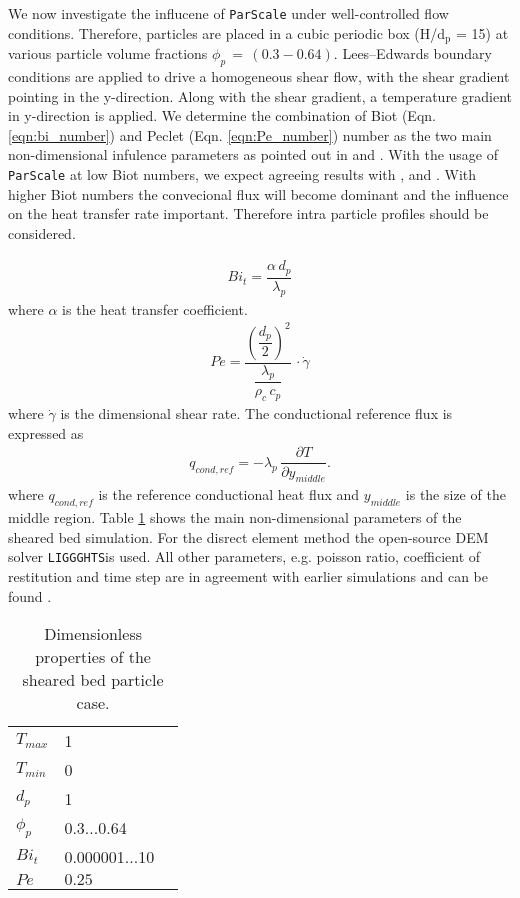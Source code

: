 \documentclass{particles2015}
\begin{document}
We now investigate the influcene of \texttt{ParScale} under well-controlled flow conditions. Therefore, particles are placed in a cubic periodic box (H/$\text{d}_\text{p}$ = 15) at various particle volume fractions $\phi_p \, =  \, (0.3 - 0.64)$. Lees–Edwards boundary conditions are applied to drive a homogeneous shear flow, with the shear gradient pointing in the y-direction. Along with the shear gradient, a temperature gradient in y-direction is applied. We determine the combination of Biot (Eqn. \ref{eqn:bi_number}) and Peclet (Eqn. \ref{eqn:Pe_number}) number as the two main non-dimensional infulence parameters as pointed out in \cite{Mohan2014} and \cite{Chialvo2012}. With the usage of \texttt{ParScale} at low Biot numbers, we expect agreeing results with \cite{Mohan2014}, \cite{Chialvo2012} and \cite{Vargas2001}. With higher Biot numbers the convecional flux will become dominant and the influence on the heat transfer rate important. Therefore intra particle profiles should be considered.

\begin{align}
Bi_t = \dfrac{\alpha\, d_p}{\lambda_p}
\label{eqn:bi_number}
\end{align}
where $\alpha$ is the heat transfer coefficient.
\begin{align}
Pe = \dfrac{\left(\dfrac{d_p}{2}\right)^2}{\dfrac{\lambda_p}{\rho_c \, c_p}} \, \cdot \dot{\gamma}
\label{eqn:Pe_number}
\end{align}  
where $\dot{\gamma}$ is the dimensional shear rate. The conductional reference flux is expressed as \cite{Chialvo2012}
\begin{align}
q_{cond,ref} = - \lambda_p \, \dfrac{\partial T}{\partial y_{middle}}.
\end{align}
where $q_{cond,ref}$ is the reference conductional heat flux and $y_{middle}$ is the size of the middle region. Table \ref{tab:properties_sheard_bed} shows the main non-dimensional parameters of the sheared bed simulation. For the disrect element method the open-source DEM solver \texttt{LIGGGHTS}\textregistered is used. All other parameters, e.g. poisson ratio, coefficient of restitution and time step are in agreement with earlier simulations and can be found \cite{Mohan2014}.

\begin{table}[h]
  \centering 
  \caption{Dimensionless properties of the sheared bed particle case.}
   \begin{tabular}{llr}
      \hline 
        $T_{max}$				& 1 & \\
        $T_{min}$				& 0 & \\
        $d_p$					& 1 & \\
        $\phi_p$				& 0.3...0.64 &\\
        $Bi_t$					& 0.000001...10 & \\
        $Pe$ 					& $0.25$& \\
      \hline      
       \end{tabular}
   \setlength{\belowcaptionskip}{12pt}
   \label{tab:properties_sheard_bed}
\end{table}
\end{document}
